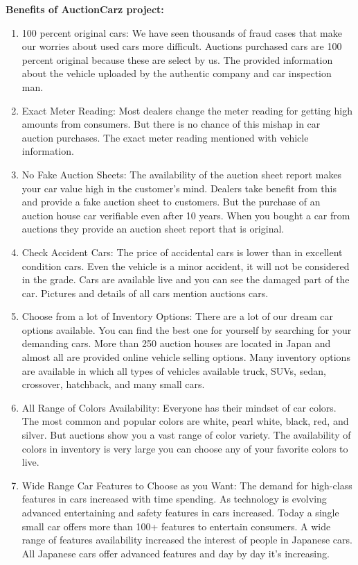 \documentclass{report}
\begin{document}
\textbf{Benefits of AuctionCarz project:}

\begin{enumerate}
\item 100 percent original cars: We have seen thousands of fraud cases that make our worries     about used cars more difficult. Auctions purchased cars are 100 percent original because these are select by us. The provided information about the vehicle uploaded by the authentic company and car inspection man.
\item Exact Meter Reading:  Most dealers change the meter reading for getting high amounts from consumers. But there is no chance of this mishap in car auction purchases. The exact meter reading mentioned with vehicle information.
\item No Fake Auction Sheets: The availability of the auction sheet report makes your car value high in the customer’s mind. Dealers take benefit from this and provide a fake auction sheet to customers. But the purchase of an auction house car verifiable even after 10 years. When you bought a car from auctions they provide an auction sheet report that is original.
\item Check Accident Cars: The price of accidental cars is lower than in excellent condition cars. Even the vehicle is a minor accident, it will not be considered in the grade. Cars are available live and you can see the damaged part of the car. Pictures and details of all cars mention auctions cars.
\item Choose from a lot of Inventory Options: There are a lot of our dream car options available. You can find the best one for yourself by searching for your demanding cars. More than 250 auction houses are located in Japan and almost all are provided online vehicle selling options. Many inventory options are available in which all types of vehicles available truck, SUVs, sedan, crossover, hatchback, and many small cars.
\item All Range of Colors Availability: Everyone has their mindset of car colors. The most common and popular colors are white, pearl white, black, red, and silver. But auctions show you a vast range of color variety. The availability of colors in inventory is very large you can choose any of your favorite colors to live.
\item Wide Range Car Features to Choose as you Want: The demand for high-class features in cars increased with time spending. As technology is evolving advanced entertaining and safety features in cars increased. Today a single small car offers more than 100+ features to entertain consumers. A wide range of features availability increased the interest of people in Japanese cars. All Japanese cars offer advanced features and day by day it’s increasing.

\end{enumerate}
\end{document}
